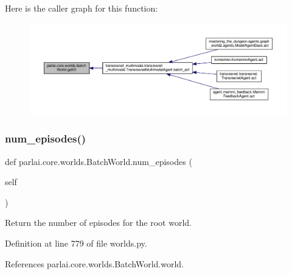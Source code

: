 Here is the caller graph for this function\+:
\nopagebreak
\begin{figure}[H]
\begin{center}
\leavevmode
\includegraphics[width=350pt]{classparlai_1_1core_1_1worlds_1_1BatchWorld_a995d9405ae22301e3ca46c43521b301a_icgraph}
\end{center}
\end{figure}
\mbox{\label{classparlai_1_1core_1_1worlds_1_1BatchWorld_ae3f96cd2de72eb0f333cb29bbf74177b}} 
\subsubsection{\texorpdfstring{num\+\_\+episodes()}{num\_episodes()}}
{\footnotesize\ttfamily def parlai.\+core.\+worlds.\+Batch\+World.\+num\+\_\+episodes (\begin{DoxyParamCaption}\item[{}]{self }\end{DoxyParamCaption})}

\begin{DoxyVerb}Return the number of episodes for the root world.\end{DoxyVerb}
 

Definition at line 779 of file worlds.\+py.



References parlai.\+core.\+worlds.\+Batch\+World.\+world.



